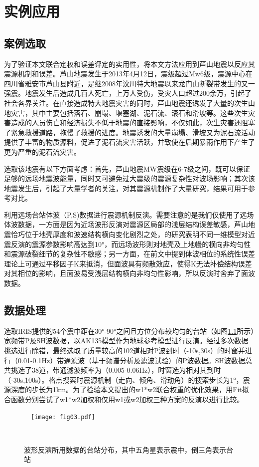

\chapter{实例应用}

\section{案例选取}

为了验证本文联合定权和误差评定的实用性，将本文方法应用到芦山地震以反应其震源机制和误差。芦山地震发生于2013年4月12日，震级超过Mw6级，震源中心在四川省雅安市芦山县附近，是继2008年汶川特大地震以来龙门山断裂带发生的又一强震。地震发生后造成几百人死亡，上万人受伤，受灾人口超过200余万\citep{崔鹏2013}，引起了社会各界关注。在直接造成特大地震灾害的同时，芦山地震还诱发了大量的次生山地灾害，其中主要包括落石、崩塌、堰塞湖、泥石流、滚石和滑坡等\citep{陈晓清2013}。这些次生灾害造成的人员伤亡和经济损失不低于地震的直接影响，不仅如此，次生灾害还阻塞了紧急救援道路，拖慢了救援的进度。地震诱发的大量崩塌、滑坡又为泥石流活动提供了丰富的物质源料，促进了泥石流灾害活跃，并致使在后期暴雨作用下产生了更为严重的泥石流灾害。

选取该地震有以下方面考虑：首先，芦山地震MW震级在6-7级之间，既可以保证足够的远场地震波能量，同时又可避免过大震级的震源复杂性对波场影响；其次该地震发生后，引起了大量学者的关注，对其震源机制作了大量研究，结果可用于参考对比。

利用远场台站体波（P,S)数据进行震源机制反演。需要注意的是我们仅使用了远场体波数据，一方面是因为近场波形反演对震源区局部的浅层结构误差敏感，芦山地震恰巧位于地壳厚度和波速结构横向变化剧烈之处\citep{郑勇2013,高原2013}，\citet{谢祖军2013}的研究表明不同一维模型对近震反演的震源参数影响高达到10°，而远场波形则对地壳及上地幔的横向非均匀性和震源破裂细节的复杂性不敏感；另一方面，在前文中提到体波相位的系统性误差理论上可通过平移因子K来抵消，但面波具有频散效应，使得K无法补偿结构误差对其相位的影响，且面波易受浅层结构横向非均匀性影响，所以反演时舍弃了面波数据。

\section{数据处理}

选取IRIS提供的54个震中距在30°-90°之间且方位分布较均匀的台站（如图\ref{fig03}所示）宽频带P及SH波数据，以AK135模型\citep{Kennett1995}作为地球参考模型进行反演。经过多次数据挑选进行除错，最终选取了质量较高的102道相对P波到时（-10s,30s）的时窗并进行（0.01-0.1Hz）带通滤波（基于频谱分析及滤波试验）的P波数据。SH波数据总共挑选了38道，带通滤波频率为（0.005-0.06Hz），时窗选为相对其到时（-30s,100s）。格点搜索时震源机制（走向、倾角、滑动角）的搜索步长为1°，震源深度的步长为1km。为了检验本文提出的w1*w2联合权重的优化效果，用Fit拟合函数分别尝试了w1*w2加权和仅用w1或w2加权三种方案的反演以进行比较。
\begin{figure}
\centering
  \texttt{[image: fig03.pdf]}
  \caption{波形反演所用数据的台站分布，其中五角星表示震中，倒三角表示台站}
  \label{fig03}
\end{figure}
